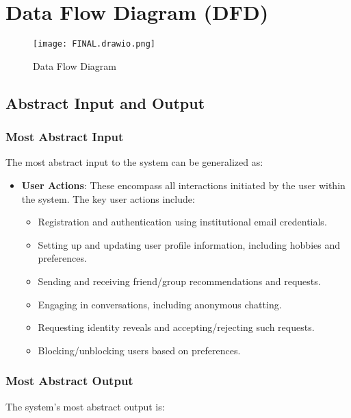 \documentclass[12pt,a4paper]{article}
\begin{document}
\section{Data Flow Diagram (DFD)}
\begin{figure}[!h]
\vspace{0 cm}
  \centering
\texttt{[image: FINAL.drawio.png]}
  \caption{Data Flow Diagram}
  \label{fig:yourimage}
\end{figure}
\subsection{Abstract Input and Output}

\subsubsection{Most Abstract Input}
The most abstract input to the system can be generalized as:

\begin{itemize}
    \item \textbf{User Actions}: These encompass all interactions initiated by the user within the system. The key user actions include:
    \begin{itemize}
        \item Registration and authentication using institutional email credentials.
        \item Setting up and updating user profile information, including hobbies and preferences.
        \item Sending and receiving friend/group recommendations and requests.
        \item Engaging in conversations, including anonymous chatting.
        \item Requesting identity reveals and accepting/rejecting such requests.
        \item Blocking/unblocking users based on preferences.
    \end{itemize}
\end{itemize}

\subsubsection{Most Abstract Output}
The system's most abstract output is:
\end{document}
